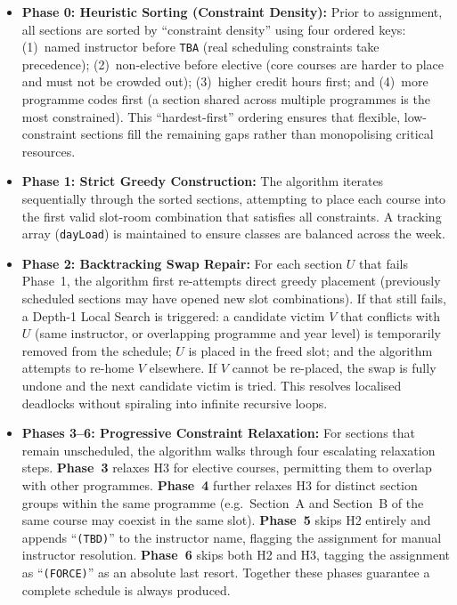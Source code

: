 \documentclass[12pt, a4paper]{article}
\begin{document}
\begin{itemize}[topsep=4pt]
    \item \textbf{Phase 0: Heuristic Sorting (Constraint Density):} Prior to assignment,
          all sections are sorted by ``constraint density'' using four ordered keys:
          (1)~named instructor before \texttt{TBA} (real scheduling constraints take
          precedence); (2)~non-elective before elective (core courses are harder to
          place and must not be crowded out); (3)~higher credit hours first; and
          (4)~more programme codes first (a section shared across multiple programmes
          is the most constrained). This ``hardest-first'' ordering ensures that
          flexible, low-constraint sections fill the remaining gaps rather than
          monopolising critical resources.

    \item \textbf{Phase 1: Strict Greedy Construction:} The algorithm iterates
          sequentially through the sorted sections, attempting to place each course into
          the first valid slot-room combination that satisfies all constraints. A tracking
          array (\texttt{dayLoad}) is maintained to ensure classes are balanced across
          the week.

    \item \textbf{Phase 2: Backtracking Swap Repair:} For each section $U$ that
          fails Phase~1, the algorithm first re-attempts direct greedy placement
          (previously scheduled sections may have opened new slot combinations).
          If that still fails, a Depth-1 Local Search is triggered: a candidate
          victim $V$ that conflicts with $U$ (same instructor, or overlapping
          programme and year level) is temporarily removed from the schedule;
          $U$ is placed in the freed slot; and the algorithm attempts to re-home $V$
          elsewhere. If $V$ cannot be re-placed, the swap is fully undone and the
          next candidate victim is tried. This resolves localised deadlocks without
          spiraling into infinite recursive loops.

    \item \textbf{Phases 3--6: Progressive Constraint Relaxation:} For sections that
          remain unscheduled, the algorithm walks through four escalating relaxation
          steps. \textbf{Phase~3} relaxes H3 for elective courses, permitting them
          to overlap with other programmes. \textbf{Phase~4} further relaxes H3 for
          distinct section groups within the same programme (e.g.\ Section~A and
          Section~B of the same course may coexist in the same slot). \textbf{Phase~5}
          skips H2 entirely and appends ``\texttt{(TBD)}'' to the instructor name,
          flagging the assignment for manual instructor resolution. \textbf{Phase~6}
          skips both H2 and H3, tagging the assignment as ``\texttt{(FORCE)}'' as an
          absolute last resort. Together these phases guarantee a complete schedule is
          always produced.
\end{itemize}
\end{document}
